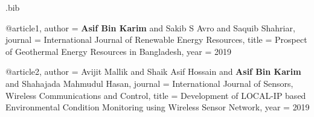 %
%


\RequirePackage{filecontents}
\begin{filecontents*}{\jobname.bib}

@article{1,
author = { \textbf{Asif  Bin  Karim} and Sakib  S Avro and  Saquib Shahriar},
journal = {International Journal of Renewable Energy Resources},
title = {{Prospect of Geothermal Energy Resources in Bangladesh}},
year = {2019}
}

@article{2,
author = {Avijit Mallik and Shaik Asif Hossain and \textbf{Asif Bin Karim} and Shahajada Mahmudul Hasan},
journal = {International Journal of Sensors, Wireless Communications and Control},
title = {{Development of LOCAL-IP based Environmental Condition Monitoring using Wireless Sensor Network}},
year = {2019}
}

\end{filecontents*}

\documentclass[12pt,a4paper,sans]{moderncv}        %
\usepackage{fontspec,lipsum}
 \setmainfont{Times New Roman}
 \usepackage{color}

 \usepackage{lipsum}

\usepackage[utf8]{inputenc}                       %

